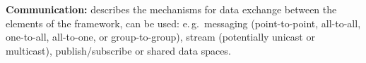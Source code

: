 \documentclass[conference,final]{IEEEtran}
\newcommand{\alnote}[1]{ {\textcolor{blue} { ***andre: #1 }}}
\newcommand{\alnote}[1]{}
\begin{document}

% 




\textbf{Communication:} describes the mechanisms for data exchange
between the elements of the framework, can be used: e.\,g.\ messaging 
(point-to-point, all-to-all, one-to-all, all-to-one, or
group-to-group), stream (potentially unicast or multicast),
publish/subscribe or shared data spaces. 
		
\end{document}
